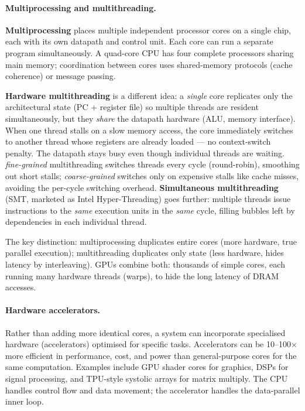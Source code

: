 \documentclass[9pt, a4paper]{extarticle}
\begin{document}
\paragraph{Multiprocessing and multithreading.} \textbf{Multiprocessing} places multiple independent processor cores on a single chip, each with its own datapath and control unit. Each core can run a separate program simultaneously. A quad-core CPU has four complete processors sharing main memory; coordination between cores uses shared-memory protocols (cache coherence) or message passing.

\textbf{Hardware multithreading} is a different idea: a \emph{single} core replicates only the architectural state (PC + register file) so multiple threads are resident simultaneously, but they \emph{share} the datapath hardware (ALU, memory interface). When one thread stalls on a slow memory access, the core immediately switches to another thread whose registers are already loaded --- no context-switch penalty. The datapath stays busy even though individual threads are waiting. \textit{fine-grained} multithreading switches threads every cycle (round-robin), smoothing out short stalls; \textit{coarse-grained} switches only on expensive stalls like cache misses, avoiding the per-cycle switching overhead. \textbf{Simultaneous multithreading} (SMT, marketed as Intel Hyper-Threading) goes further: multiple threads issue instructions to the \emph{same} execution units in the \emph{same} cycle, filling bubbles left by dependencies in each individual thread.

The key distinction: multiprocessing duplicates entire cores (more hardware, true parallel execution); multithreading duplicates only state (less hardware, hides latency by interleaving). GPUs combine both: thousands of simple cores, each running many hardware threads (warps), to hide the long latency of DRAM accesses.

\paragraph{Hardware accelerators.} Rather than adding more identical cores, a system can incorporate specialised hardware (accelerators) optimised for specific tasks. Accelerators can be 10--100$\times$ more efficient in performance, cost, and power than general-purpose cores for the same computation. Examples include GPU shader cores for graphics, DSPs for signal processing, and TPU-style systolic arrays for matrix multiply. The CPU handles control flow and data movement; the accelerator handles the data-parallel inner loop.
\end{document}
